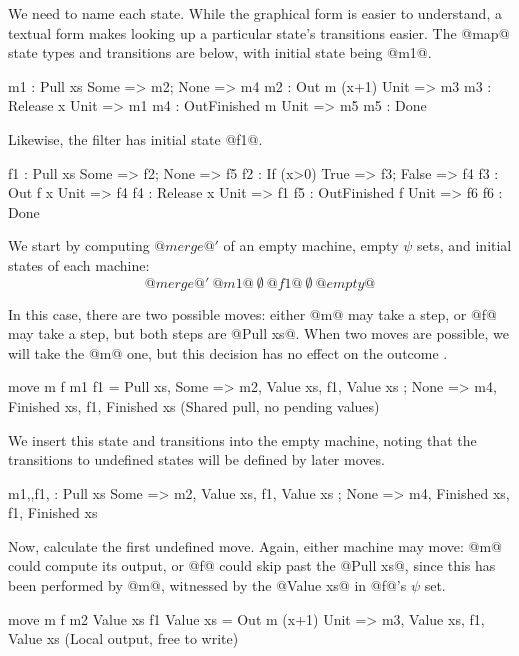 We need to name each state.
While the graphical form is easier to understand, a textual form makes looking up a particular state's transitions easier.
The @map@ state types and transitions are below, with initial state being @m1@.

\begin{code}
m1 : Pull xs     { Some => m2; None => m4 }
m2 : Out m (x+1) { Unit => m3 }
m3 : Release x   { Unit => m1 }
m4 : OutFinished m{ Unit => m5 }
m5 : Done
\end{code}

Likewise, the filter has initial state @f1@.

\begin{code}
f1 : Pull xs     { Some => f2; None  => f5 }
f2 : If (x>0)    { True => f3; False => f4 }
f3 : Out f x     { Unit => f4 }
f4 : Release x   { Unit => f1 }
f5 : OutFinished f{ Unit => f6 }
f6 : Done
\end{code}

We start by computing $@merge@'$ of an empty machine, empty $\psi$ sets, and initial states of each machine:
$$
@merge@'~@m1@~\emptyset~@f1@~\emptyset~@empty@
$$

In this case, there are two possible moves: either @m@ may take a step, or @f@ may take a step, but both steps are @Pull xs@. When two moves are possible, we will take the @m@ one, but this decision has no effect on the outcome .
\begin{code}
move m f m1 {} f1 {} =
    Pull xs,
    { Some => m2, {Value xs},    f1, {Value xs}
    ; None => m4, {Finished xs}, f1, {Finished xs} }
(Shared pull, no pending values)
\end{code}

We insert this state and transitions into the empty machine, noting that the transitions to undefined states will be defined by later moves.

\begin{code}
m1,{},f1,{}
    : Pull xs
    { Some => m2, {Value xs},    f1, {Value xs}
    ; None => m4, {Finished xs}, f1, {Finished xs} }
\end{code}

Now, calculate the first undefined move.
Again, either machine may move: @m@ could compute its output, or @f@ could skip past the @Pull xs@, since this has been performed by @m@, witnessed by the @Value xs@ in @f@'s $\psi$ set.

\begin{code}
move m f m2 {Value xs} f1 {Value xs} =
    Out m (x+1)
    { Unit => m3, {Value xs}, f1, {Value xs} }
(Local output, free to write)
\end{code}

